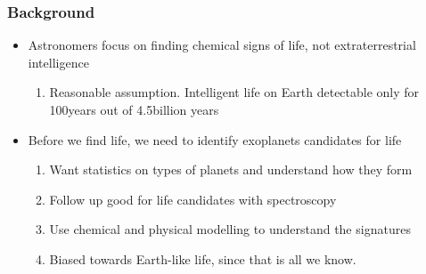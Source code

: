 \documentclass{beamer}
\begin{document}
\frametitle{Background}
\begin{frame}
\begin{itemize}
    \item Astronomers focus on finding chemical signs of life, not extraterrestrial intelligence
    \pause
    \begin{enumerate}
        \item Reasonable assumption. Intelligent life on Earth detectable only for
              100years out of 4.5billion years
    \end{enumerate}
    \item Before we find life, we need to identify exoplanets candidates for life
    \pause
    \begin{enumerate}
        \item Want statistics on types of planets and understand how they form
        \pause
        \item Follow up good for life candidates with spectroscopy 
        \pause
        \item Use chemical and physical modelling to understand the signatures
        \pause
        \item Biased towards Earth-like life, since that is all we know.
    \end{enumerate}
\end{itemize}
\end{frame}
\end{document}
